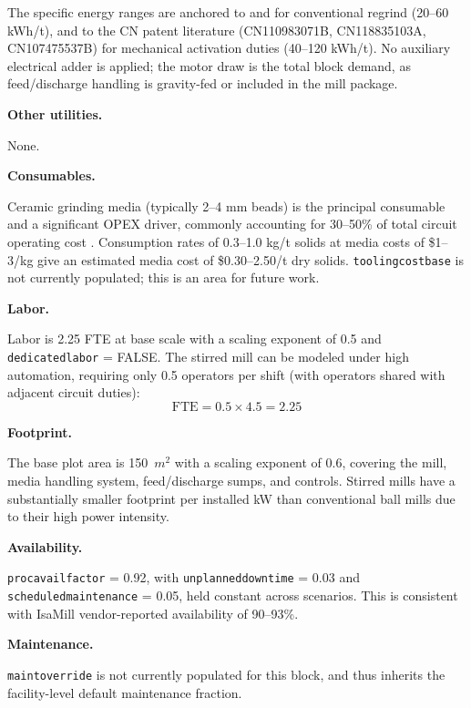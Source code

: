 \documentclass{article}
\renewcommand\_{\textunderscore\allowbreak}
\begin{document}
\noindent The specific energy ranges are anchored to \citet{debakkerEnergyUseFine2014} and \citet{brissetteEnergySavingsTechnology2010} for conventional regrind (20--60 kWh/t), and to the CN patent literature (CN110983071B, CN118835103A, CN107475537B) for mechanical activation duties (40--120 kWh/t). No auxiliary electrical adder is applied; the motor draw is the total block demand, as feed/discharge handling is gravity-fed or included in the mill package.

\medskip
\noindent\textbf{Other utilities.}\quad

None.

\medskip
\noindent\textbf{Consumables.}\quad

Ceramic grinding media (typically 2--4 mm beads) is the principal consumable and a significant OPEX driver, commonly accounting for 30--50\% of total circuit operating cost \citep{debakkerEnergyUseFine2014}. Consumption rates of 0.3--1.0 kg/t solids at media costs of \$1--3/kg give an estimated media cost of \$0.30--2.50/t dry solids. \texttt{tooling\_cost\_base} is not currently populated; this is an area for future work.

\medskip
\noindent\textbf{Labor.}\quad

Labor is 2.25 FTE at base scale with a scaling exponent of 0.5 and \texttt{dedicated\_labor} = FALSE. The stirred mill can be modeled under high automation, requiring only 0.5 operators per shift (with operators shared with adjacent circuit duties):
\[
	\text{FTE} = 0.5 \times 4.5 = 2.25
\]

\medskip
\noindent\textbf{Footprint.}\quad

The base plot area is 150~$\si{m^2}$ with a scaling exponent of 0.6, covering the mill, media handling system, feed/discharge sumps, and controls. Stirred mills have a substantially smaller footprint per installed kW than conventional ball mills due to their high power intensity.

\medskip
\noindent\textbf{Availability.}\quad

\texttt{proc\_avail\_factor} = 0.92, with \texttt{unplanned\_downtime} = 0.03 and \texttt{scheduled\_maintenance} = 0.05, held constant across scenarios. This is consistent with IsaMill vendor-reported availability of 90--93\%.

\medskip
\noindent\textbf{Maintenance.}\quad

\texttt{maint\_override} is not currently populated for this block, and thus inherits the facility-level default maintenance fraction.
\end{document}
